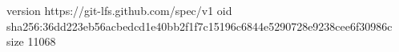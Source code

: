 version https://git-lfs.github.com/spec/v1
oid sha256:36dd223eb56acbedcd1e40bb2f1f7c15196c6844e5290728e9238cee6f30986c
size 11068
